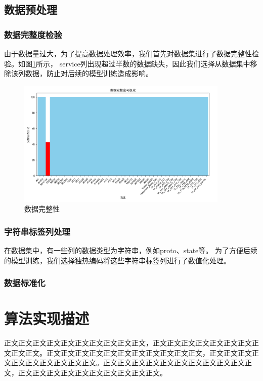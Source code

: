 \documentclass{article}
\begin{document}
\subsection{数据预处理}

\subsubsection{数据完整度检验}
由于数据量过大，为了提高数据处理效率，我们首先对数据集进行了数据完整性检验。如图\ref{fig:full}所示，
service列出现超过半数的数据缺失，因此我们选择从数据集中移除该列数据，防止对后续的模型训练造成影响。
\begin{figure}[htpb]
  \centering
  \includegraphics[width=0.9\textwidth]{./png/full.png}
  \caption{数据完整性}
  \label{fig:full}
\end{figure}
\subsubsection{字符串标签列处理}
在数据集中，有一些列的数据类型为字符串，例如proto、state等。
为了方便后续的模型训练，我们选择独热编码将这些字符串标签列进行了数值化处理。
\subsubsection{数据标准化}





\section{算法实现描述}
正文正文正文正文正文正文正文正文正文正文，正文正文正文正文正文正文正文正文正文正文。正文正文正文正文正文正文正文正文正文正文正文，正文正文正文正文正文正文正文正文正文正文。正文正文正文正文正文正文正文正文正文正文正文，正文正文正文正文正文正文正文正文正文正文。
\end{document}
